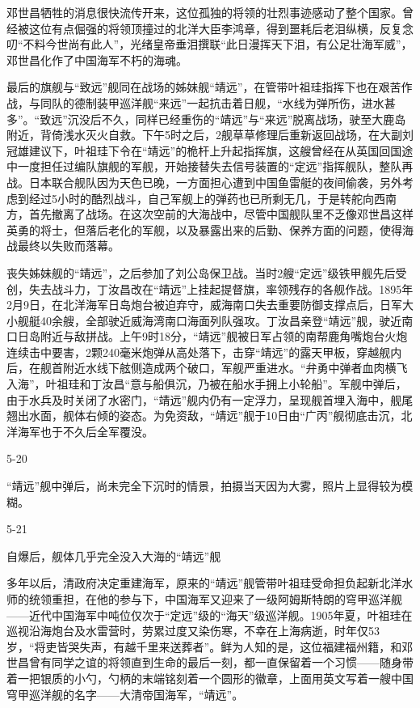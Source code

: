 \documentclass[12pt,UTF8]{ctexbook}
\begin{document}
邓世昌牺牲的消息很快流传开来，这位孤独的将领的壮烈事迹感动了整个国家。曾经被这位有点倔强的将领顶撞过的北洋大臣李鸿章，得到噩耗后老泪纵横，反复念叨“不料今世尚有此人”，光绪皇帝垂泪撰联“此日漫挥天下泪，有公足壮海军威”，邓世昌化作了中国海军不朽的海魂。

最后的旗舰与“致远”舰同在战场的姊妹舰“靖远”，在管带叶祖珪指挥下也在艰苦作战，与同队的德制装甲巡洋舰“来远”一起抗击着日舰，“水线为弹所伤，进水甚多”。“致远”沉没后不久，同样已经重伤的“靖远”与“来远”脱离战场，驶至大鹿岛附近，背倚浅水灭火自救。下午5时之后，2舰草草修理后重新返回战场，在大副刘冠雄建议下，叶祖珪下令在“靖远”的桅杆上升起指挥旗，这艘曾经在从英国回国途中一度担任过编队旗舰的军舰，开始接替失去信号装置的“定远”指挥舰队，整队再战。日本联合舰队因为天色已晚，一方面担心遭到中国鱼雷艇的夜间偷袭，另外考虑到经过5小时的酷烈战斗，自己军舰上的弹药也已所剩无几，于是转舵向西南方，首先撤离了战场。在这次空前的大海战中，尽管中国舰队里不乏像邓世昌这样英勇的将士，但落后老化的军舰，以及暴露出来的后勤、保养方面的问题，使得海战最终以失败而落幕。

丧失姊妹舰的“靖远”，之后参加了刘公岛保卫战。当时2艘“定远”级铁甲舰先后受创，失去战斗力，丁汝昌改在“靖远”上挂起提督旗，率领残存的各舰作战。1895年2月9日，在北洋海军日岛炮台被迫弃守，威海南口失去重要防御支撑点后，日军大小舰艇40余艘，全部驶近威海湾南口海面列队强攻。丁汝昌亲登“靖远”舰，驶近南口日岛附近与敌拼战。上午9时18分，“靖远”舰被日军占领的南帮鹿角嘴炮台火炮连续击中要害，2颗240毫米炮弹从高处落下，击穿“靖远”的露天甲板，穿越舰内后，在舰首附近水线下舷侧造成两个破口，军舰严重进水。“弁勇中弹者血肉横飞入海”，叶祖珪和丁汝昌“意与船俱沉，乃被在船水手拥上小轮船”。军舰中弹后，由于水兵及时关闭了水密门，“靖远”舰内仍有一定浮力，呈现舰首埋入海中，舰尾翘出水面，舰体右倾的姿态。为免资敌，“靖远”舰于10日由“广丙”舰彻底击沉，北洋海军也于不久后全军覆没。

5-20

“靖远”舰中弹后，尚未完全下沉时的情景，拍摄当天因为大雾，照片上显得较为模糊。

5-21

自爆后，舰体几乎完全没入大海的“靖远”舰

多年以后，清政府决定重建海军，原来的“靖远”舰管带叶祖珪受命担负起新北洋水师的统领重担，在他的参与下，中国海军又迎来了一级阿姆斯特朗的穹甲巡洋舰——近代中国海军中吨位仅次于“定远”级的“海天”级巡洋舰。1905年夏，叶祖珪在巡视沿海炮台及水雷营时，劳累过度又染伤寒，不幸在上海病逝，时年仅53岁，“将吏皆哭失声，有越千里来送葬者”。鲜为人知的是，这位福建福州籍，和邓世昌曾有同学之谊的将领直到生命的最后一刻，都一直保留着一个习惯——随身带着一把银质的小勺，勺柄的末端铭刻着一个圆形的徽章，上面用英文写着一艘中国穹甲巡洋舰的名字——大清帝国海军，“靖远”。
\end{document}

